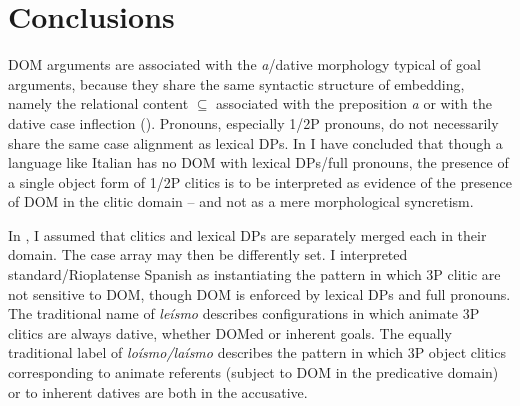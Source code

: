 \documentclass[output=paper,colorlinks,citecolor=brown,nonflat]{./langscibook}
\begin{document}
\section{ Conclusions}\label{sec:manzini:4}

DOM arguments are associated with the \textit{a}/dative morphology typical of goal arguments, because they share the same syntactic structure of embedding, namely the relational content ${\subseteq}$ associated with the preposition \textit{a} or with the dative case inflection (). Pronouns, especially 1/2P pronouns, do not necessarily share the same case alignment as lexical DPs. In  I have concluded that though a language like Italian has no DOM with lexical DPs/full pronouns, the presence of a single object form of 1/2P clitics is to be interpreted as evidence of the presence of DOM in the clitic domain – and not as a mere morphological syncretism.

In , I assumed that clitics and lexical DPs are separately merged each in their domain. The case array may then be differently set. I interpreted standard/Rioplatense Spanish as instantiating the pattern in which 3P clitic are not sensitive to DOM, though DOM is enforced by lexical DPs and full pronouns. The traditional name of \textit{leísmo} describes configurations in which animate 3P clitics are always dative, whether DOMed or inherent goals. The equally traditional label of \textit{loísmo/laísmo} describes the pattern in which 3P object clitics corresponding to animate referents (subject to DOM in the predicative domain) or to inherent datives are both in the accusative.

\sloppy
\printbibliography[heading=subbibliography,notkeyword=this]
\end{document}
